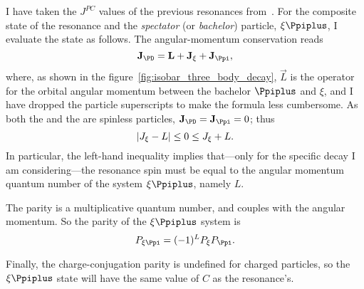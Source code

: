     I have taken the $J^{PC}$ values of the previous resonances from~\cite{chinese_phisics}.
    For the composite state of the resonance and the \emph{spectator} (or \emph{bachelor}) particle, $\xi\Ppiplus$, I evaluate the state as follows. 
    The angular-momentum conservation reads
    \begin{equation}
        \vec{J}_{\PD} = \vec{L} + \vec{J}_{\xi} + \vec{J}_{\Ppi},
    \end{equation}
    where, as shown in the figure~\ref{fig:isobar_three_body_decay}, $\vec{L}$ is the operator for the orbital angular momentum between the bachelor $\Ppiplus$ and $\xi$, and I have dropped the particle superscripts to make the formula less cumbersome.
    As both the \Ppiplus{} and the \PDplus are spinless particles, $\vec{J}_{\PD} = \vec{J}_{\Ppi} = 0$; thus
    \begin{equation}
        \lvert J_{\xi} - L\rvert \le 0 \le J_{\xi} + L.
    \end{equation}
    In particular, the left-hand inequality implies that---only for the specific decay I am considering---the resonance spin must be equal to the angular momentum quantum number of the system $\xi\Ppiplus$, namely $L$.


    The parity is a multiplicative quantum number, and couples with the angular momentum.
    So the parity of the $\xi\Ppiplus$ system is
    \begin{equation}
        P_{\xi\Ppi} = (-1)^L P_{\xi} P_{\Ppi}.
    \end{equation}


    Finally, the charge-conjugation parity is undefined for charged particles, so the $\xi\Ppiplus$ state will have the same value of $C$ as the resonance's. 



